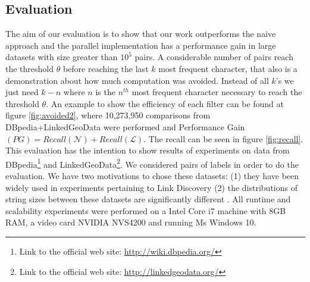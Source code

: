 \subsection{Evaluation} \label{ev:mfkc}

The aim of our evaluation is to show that our work outperforms the naive approach and the parallel implementation has a performance gain in large datasets with size greater than $10^5$ pairs.
A considerable number of pairs reach the threshold $\theta$ before reaching the last $k$ most frequent character, that also is a demonstration about how much computation was avoided. 
Instead of all $k$'s we just need $k-n$ where $n$ is the $n^{th}$ most frequent character necessary to reach the threshold $\theta$. 
An example to show the efficiency of each filter can be found at  figure \ref{fig:avoided2}, where 10,273,950 comparisons from DBpedia+LinkedGeoData were performed and Performance Gain $(PG)=Recall(\mathcal{N}) + Recall(\mathcal{L})$. 
The recall can be seen in figure \ref{fig:recall}.
This evaluation has the intention to show results of experiments on data from DBpedia\footnote{Link to the official web site: \url{http://wiki.dbpedia.org/}} and LinkedGeoData\footnote{Link to the official web site: \url{http://linkedgeodata.org/}}. We considered pairs of labels in order to do the evaluation.
We have two motivations to chose these datasets: (1) they have been widely used in experiments pertaining to Link Discovery (2) the distributions of string sizes between these datasets are significantly different \cite{dressler2014efficient}. 
All runtime and scalability experiments were performed on a Intel Core i7 machine with 8GB RAM, a video card NVIDIA NVS4200 and running Ms Windows 10.
